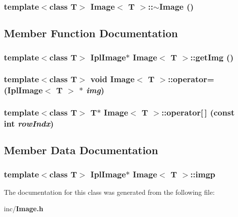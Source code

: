\subsubsection{\setlength{\rightskip}{0pt plus 5cm}template$<$class T$>$ {\bf Image}$<$ T $>$::$\sim${\bf Image} ()\hspace{0.3cm}{\tt  [inline]}}\label{classImage_d1df692cd9f89c1357ee8e7df5c62e8c}




\subsection{Member Function Documentation}
\subsubsection{\setlength{\rightskip}{0pt plus 5cm}template$<$class T$>$ IplImage$\ast$ {\bf Image}$<$ T $>$::getImg ()\hspace{0.3cm}{\tt  [inline]}}\label{classImage_81a7181e7536735b1f476e87d1cd05c3}


\subsubsection{\setlength{\rightskip}{0pt plus 5cm}template$<$class T$>$ void {\bf Image}$<$ T $>$::operator= (IplImage$<$ T $>$ $\ast$ {\em img})\hspace{0.3cm}{\tt  [inline]}}\label{classImage_66f423c6b0f483bdccd2876e27da8026}


\subsubsection{\setlength{\rightskip}{0pt plus 5cm}template$<$class T$>$ T$\ast$ {\bf Image}$<$ T $>$::operator[$\,$] (const int {\em rowIndx})\hspace{0.3cm}{\tt  [inline]}}\label{classImage_7cf6c17a13bed6acca321388a000af0f}




\subsection{Member Data Documentation}
\subsubsection{\setlength{\rightskip}{0pt plus 5cm}template$<$class T$>$ IplImage$\ast$ {\bf Image}$<$ T $>$::{\bf imgp}\hspace{0.3cm}{\tt  [private]}}\label{classImage_4a7cb0665cfa3b1aeb23b305eaa96abf}




The documentation for this class was generated from the following file:\begin{CompactItemize}
\item 
inc/{\bf Image.h}\end{CompactItemize}
